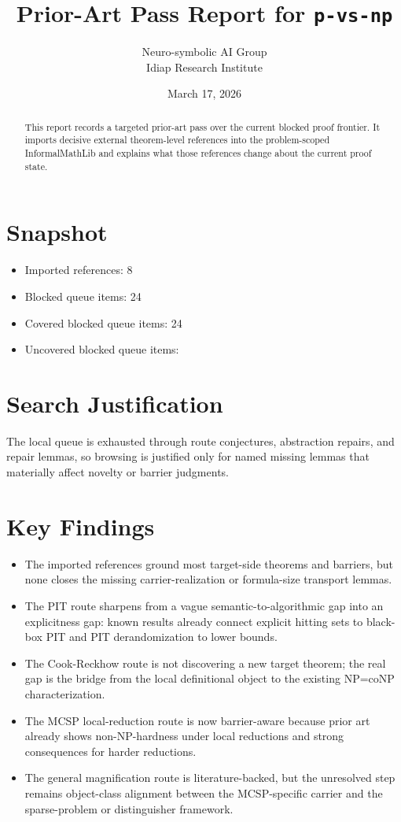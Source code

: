 \documentclass[11pt]{article}
\title{Prior-Art Pass Report for \texttt{p-vs-np}}
\author{Neuro-symbolic AI Group\\Idiap Research Institute}
\date{March 17, 2026}
\begin{document}
\maketitle

\begin{abstract}
This report records a targeted prior-art pass over the current blocked proof frontier. It imports decisive external theorem-level references into the problem-scoped InformalMathLib and explains what those references change about the current proof state.
\end{abstract}

\section{Snapshot}
\begin{itemize}[leftmargin=*,itemsep=0.2em]
\item Imported references: 8
\item Blocked queue items: 24
\item Covered blocked queue items: 24
\item Uncovered blocked queue items: 
\end{itemize}

\section{Search Justification}
The local queue is exhausted through route conjectures, abstraction repairs, and repair lemmas, so browsing is justified only for named missing lemmas that materially affect novelty or barrier judgments.

\section{Key Findings}
\begin{itemize}[leftmargin=*,itemsep=0.2em]
\item The imported references ground most target-side theorems and barriers, but none closes the missing carrier-realization or formula-size transport lemmas.
\item The PIT route sharpens from a vague semantic-to-algorithmic gap into an explicitness gap: known results already connect explicit hitting sets to black-box PIT and PIT derandomization to lower bounds.
\item The Cook-Reckhow route is not discovering a new target theorem; the real gap is the bridge from the local definitional object to the existing NP=coNP characterization.
\item The MCSP local-reduction route is now barrier-aware because prior art already shows non-NP-hardness under local reductions and strong consequences for harder reductions.
\item The general magnification route is literature-backed, but the unresolved step remains object-class alignment between the MCSP-specific carrier and the sparse-problem or distinguisher framework.
\end{itemize}
\end{document}
